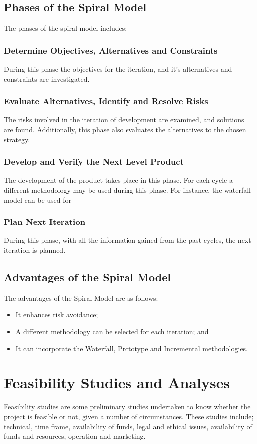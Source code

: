 \subsection{Phases of the Spiral Model}
The phases of the spiral model includes:

\subsubsection{Determine Objectives, Alternatives and Constraints}
During this phase the objectives for the iteration, and it's alternatives and constraints are investigated.

\subsubsection{Evaluate Alternatives, Identify and Resolve Risks}
The risks involved in the iteration of development are examined, and solutions are found. Additionally, this phase also evaluates the alternatives to the chosen strategy.

\subsubsection{Develop and Verify the Next Level Product}
The development of the product takes place in this phase. For each cycle a different methodology may be used during this phase. For instance, the waterfall model can be used for 

\subsubsection{Plan Next Iteration}
During this phase, with all the information gained from the past cycles, the next iteration is planned.

\subsection{Advantages of the Spiral Model}
The advantages of the Spiral Model are as follows:
\begin{itemize}
	\item It enhances risk avoidance;
	\item A different methodology can be selected for each iteration; and 
	\item It can incorporate the Waterfall, Prototype and Incremental methodologies.
\end{itemize}

\section{Feasibility Studies and Analyses}
Feasibility studies are some preliminary studies undertaken to know whether the project is feasible or not, given a number of circumstances. These studies include; technical, time frame, availability of funds, legal and ethical issues, availability of funds and resources, operation and marketing.

